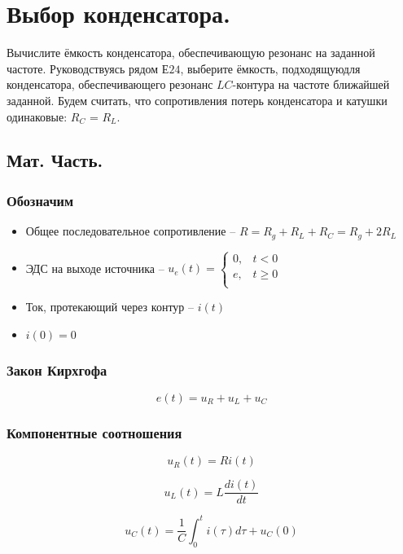 \documentclass[12pt,a4paper]{article}
\begin{document}
	\newpage
	\section{Выбор конденсатора.}
	Вычислите ёмкость конденсатора, обеспечивающую резонанс на заданной частоте. Руководствуясь рядом $Е24$, выберите ёмкость, подходящуюдля конденсатора, обеспечивающего резонанс $LC$-контура на частоте ближайшей заданной. Будем считать, что сопротивления потерь конденсатора и катушки одинаковые: $R_C$ = $R_L$.
	
	\subsection*{Мат. Часть. \newline}
	\subsubsection*{Обозначим}	
	\begin{itemize}
		\item Общее последовательное сопротивление -- $R = R_g + R_L + R_C = R_g + 2R_L$

		\item ЭДС на выходе источника -- $u_e(t) = \begin{cases} 0,& t < 0 \\ e,& t \ge 0 \\ \end{cases}$
		
		\item Ток, протекающий через контур -- $i(t)$
		
		\item $i(0) = 0$
	\end{itemize}
	
	\subsubsection*{Закон Кирхгофа}
	
	\[e(t) = u_R + u_L + u_C\]
	
	\subsubsection*{Компонентные соотношения \newline}
	\[u_R(t) = Ri(t)\]
	
	\[u_L(t) = L\frac{di(t)}{dt}\]
	
	\[u_C(t) = \frac{1}{C}\int_{0}^{t}i(\tau)d\tau + u_C(0)\]
	
\end{document}

